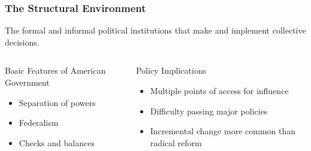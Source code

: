 \documentclass[10pt]{beamer}
\begin{document}
\begin{frame}
\frametitle{The Structural Environment}

\begin{block}{}
The formal and informal political institutions that make and implement collective decisions.
\end{block}

\vspace{0.5cm}

\begin{columns}
\begin{column}{0.48\textwidth}
\begin{block}{Basic Features of American Government}
\pause
\begin{itemize}
\item Separation of powers
\item Federalism
\item Checks and balances
\end{itemize}
\end{block}
\end{column}

\begin{column}{0.48\textwidth}
\begin{block}{Policy Implications}
\pause
\begin{itemize}
\item Multiple points of access for influence
\item Difficulty passing major policies
\item Incremental change more common than radical reform
\end{itemize}
\end{block}
\end{column}
\end{columns}

\end{frame}
\end{document}

